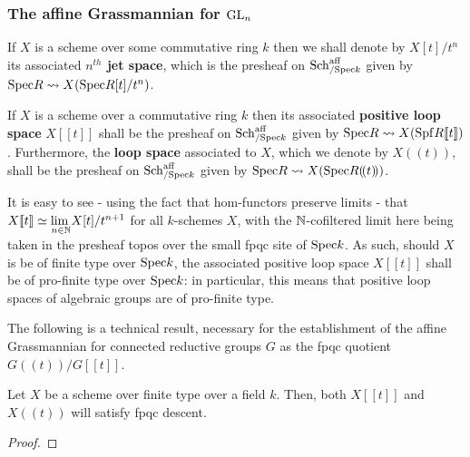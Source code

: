         \subsubsection{The affine Grassmannian for \texorpdfstring{$\operatorname{GL}_n$}{}}
            \begin{definition} \label{def: jet_spaces}
                If $X$ is a scheme over some commutative ring $k$ then we shall denote by $X[t]/t^n$ its associated \textbf{$n^{th}$ jet space}, which is the presheaf on $\mathrm{Sch}_{/\mathrm{Spec} k}^{\mathrm{aff}}$ given by $\mathrm{Spec} R \leadsto X(\mathrm{Spec} R[t]/t^n)$.
            \end{definition}
            \begin{definition} \label{def: loop_spaces}
                If $X$ is a scheme over a commutative ring $k$ then its associated \textbf{positive loop space} $X[\![t]\!]$ shall be the presheaf on $\mathrm{Sch}_{/\mathrm{Spec} k}^{\mathrm{aff}}$ given by $\mathrm{Spec} R \leadsto X(\mathrm{Spf} R[\![t]\!])$. Furthermore, the \textbf{loop space} associated to $X$, which we denote by $X(\!(t)\!)$, shall be the presheaf on $\mathrm{Sch}_{/\mathrm{Spec} k}^{\mathrm{aff}}$ given by $\mathrm{Spec} R \leadsto X(\mathrm{Spec} R(\!(t)\!))$.
            \end{definition}
            \begin{remark}
                It is easy to see - using the fact that hom-functors preserve limits - that $X[\![t]\!] \simeq \underset{n \in \mathbb{N}}{\operatorname{lim} \:} X[t]/t^{n + 1}$ for all $k$-schemes $X$, with the $\mathbb{N}$-cofiltered limit here being taken in the presheaf topos over the small fpqc site of $\mathrm{Spec} k$. As such, should $X$ is be of finite type over $\mathrm{Spec} k$, the associated positive loop space $X[\![t]\!]$ shall be of pro-finite type over $\mathrm{Spec} k$: in particular, this means that positive loop spaces of algebraic groups are of pro-finite type.
            \end{remark}
            The following is a technical result, necessary for the establishment of the affine Grassmannian for connected reductive groups $G$ as the fpqc quotient $G(\!(t)\!)/G[\![t]\!]$.
            \begin{proposition} \label{prop: loop_spaces_are_fpqc_sheaves}
                Let $X$ be a scheme over finite type over a field $k$. Then, both $X[\![t]\!]$ and $X(\!(t)\!)$ will satisfy fpqc descent. 
            \end{proposition}
                \begin{proof}
                        
                \end{proof}
            
